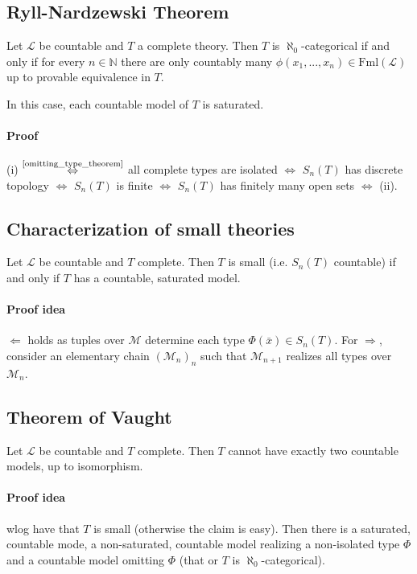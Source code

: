 \documentclass{scrartcl}
\newcommand{\N}{\mathbb{N}}
\begin{document}
\subsection{Ryll-Nardzewski Theorem}
Let $\mathcal{L}$ be countable and $T$ a complete theory. 
Then $T$ is $\aleph_0$-categorical if and only if for every $n \in \N$ there are only countably many $\phi(x_1, ..., x_n) \in \mathrm{Fml}(\mathcal{L})$ up to provable equivalence in $T$.

In this case, each countable model of $T$ is saturated.
\paragraph{Proof} (i) $\overset{\text{\ref{omitting_type_theorem}}}{\Leftrightarrow}$ all complete types are isolated $\Leftrightarrow$ $S_n(T)$ has discrete topology $\Leftrightarrow$ $S_n(T)$ is finite $\Leftrightarrow$ $S_n(T)$ has finitely many open sets $\Leftrightarrow$ (ii).

\subsection{Characterization of small theories}
Let $\mathcal{L}$ be countable and $T$ complete. Then $T$ is small (i.e. $S_n(T)$ countable) if and only if $T$ has a countable, saturated model.
\paragraph{Proof idea} $\Leftarrow$ holds as tuples over $\mathcal{M}$ determine each type $\Phi(\bar{x}) \in S_n(T)$. 
For $\Rightarrow$, consider an elementary chain $(\mathcal{M}_n)_n$ such that $\mathcal{M}_{n + 1}$ realizes all types over $\mathcal{M}_n$.

\subsection{Theorem of Vaught}
Let $\mathcal{L}$ be countable and $T$ complete. Then $T$ cannot have exactly two countable models, up to isomorphism.
\paragraph{Proof idea} wlog have that $T$ is small (otherwise the claim is easy). 
Then there is a saturated, countable mode, a non-saturated, countable model realizing a non-isolated type $\Phi$ and a countable model omitting $\Phi$ (that or $T$ is $\aleph_0$-categorical).
\end{document}
